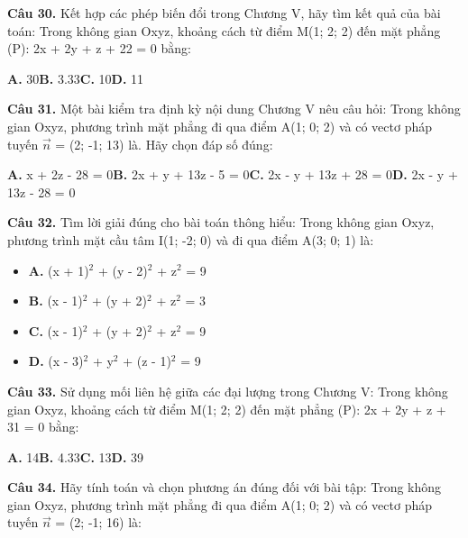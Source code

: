 \documentclass[11pt,a4paper]{article}
\begin{document}
\textbf{\color{primary} Câu 30.} Kết hợp các phép biến đổi trong Chương V, hãy tìm kết quả của bài toán: Trong không gian Oxyz, khoảng cách từ điểm M(1; 2; 2) đến mặt phẳng (P): 2x + 2y + z + 22 = 0 bằng:\par
\hspace*{1.5em}\textbf{A.} 30\quad\quad \textbf{B.} 3.33\quad\quad \textbf{C.} 10\quad\quad \textbf{D.} 11\par\vspace{2pt}
\textbf{\color{primary} Câu 31.} Một bài kiểm tra định kỳ nội dung Chương V nêu câu hỏi: Trong không gian Oxyz, phương trình mặt phẳng đi qua điểm A(1; 0; 2) và có vectơ pháp tuyến $\vec{n}$ = (2; -1; 13) là. Hãy chọn đáp số đúng:\par
\hspace*{1.5em}\textbf{A.} x + 2z - 28 = 0\quad\quad \textbf{B.} 2x + y + 13z - 5 = 0\quad\quad \textbf{C.} 2x - y + 13z + 28 = 0\quad\quad \textbf{D.} 2x - y + 13z - 28 = 0\par\vspace{2pt}
\textbf{\color{primary} Câu 32.} Tìm lời giải đúng cho bài toán thông hiểu: Trong không gian Oxyz, phương trình mặt cầu tâm I(1; -2; 0) và đi qua điểm A(3; 0; 1) là:\par
\begin{itemize}\setlength{\itemsep}{1pt}\setlength{\parskip}{0pt}
  \item[] \textbf{A.} (x + 1)$^2$ + (y - 2)$^2$ + z$^2$ = 9
  \item[] \textbf{B.} (x - 1)$^2$ + (y + 2)$^2$ + z$^2$ = 3
  \item[] \textbf{C.} (x - 1)$^2$ + (y + 2)$^2$ + z$^2$ = 9
  \item[] \textbf{D.} (x - 3)$^2$ + y$^2$ + (z - 1)$^2$ = 9
\end{itemize}\vspace{2pt}
\textbf{\color{primary} Câu 33.} Sử dụng mối liên hệ giữa các đại lượng trong Chương V: Trong không gian Oxyz, khoảng cách từ điểm M(1; 2; 2) đến mặt phẳng (P): 2x + 2y + z + 31 = 0 bằng:\par
\hspace*{1.5em}\textbf{A.} 14\quad\quad \textbf{B.} 4.33\quad\quad \textbf{C.} 13\quad\quad \textbf{D.} 39\par\vspace{2pt}
\textbf{\color{primary} Câu 34.} Hãy tính toán và chọn phương án đúng đối với bài tập: Trong không gian Oxyz, phương trình mặt phẳng đi qua điểm A(1; 0; 2) và có vectơ pháp tuyến $\vec{n}$ = (2; -1; 16) là:\par
\end{document}
